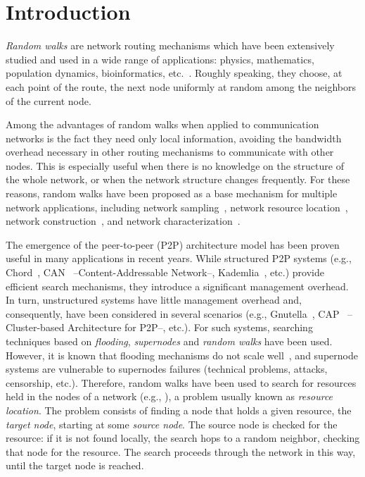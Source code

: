 \documentclass[]{elsarticle}
\begin{document}
\section{Introduction}

\emph{Random walks} are network routing mechanisms which have been extensively studied and used in  a wide range of applications: physics, mathematics,  population dynamics, bioinformatics, etc.~\cite{rw:Hughes95,rw:Lovasz93,rw:Newman06}. Roughly speaking, they choose, at each point of the route, the next node uniformly at random among the neighbors of the current node.

Among the advantages of random walks when applied to communication networks is the fact they need only local information, avoiding the bandwidth overhead necessary in other routing mechanisms to communicate with other nodes. This is especially useful when there is no knowledge on the structure of the whole network, or when the network structure changes frequently. For these reasons, random walks have been proposed as a base mechanism for multiple network applications, including network sampling~\cite{rw:Fortunato06,rw:Lee06}, network resource location~\cite{rw:Adamic01,rw:Gkantsidis06,rw:Rodero10,rw:Yang05}, network construction~\cite{rw:Chawathe03,rw:Law03,rw:Lv02b,rw:Lv02,rw:Mabrouki07}, and network characterization~\cite{rw:Dolev06,rw:Sadagopan05,rw:Tadic01}.

The emergence of the peer-to-peer (P2P) architecture model has been proven useful in many applications in recent years. While structured P2P systems (e.g., Chord~\cite{rod:Stoica01}, CAN~\cite{Ratnasamy:2001:SCN:964723.383072} --Content-Addressable Network--, Kademlia~\cite{Maymounkov:2002:KPI:646334.687801}, etc.) provide efficient search mechanisms, they introduce a significant management overhead. In turn, unstructured systems have little management overhead and, consequently, have been considered in several scenarios (e.g., Gnutella~\cite{rw:Chawathe03,rw:Lv02}, CAP~\cite{Krishnamurthy:2001:EMC:505202.505216} --Cluster-based Architecture for P2P--, etc.). For such systems, searching techniques based on \emph{flooding}, \emph{supernodes} and \emph{random walks} have been used. However, it is known that flooding mechanisms do not scale well~\cite{rod:Jovanovic01}, and supernode systems are vulnerable to supernodes failures (technical problems, attacks, censorship, etc.). Therefore, random walks have been used to search for resources held in the nodes of a network (e.g., \cite{rw:Chawathe03,Manku:2004:KTN:1007352.1007368}), a problem usually known as \emph{resource location}. The problem consists of finding a node that holds a given resource, the \emph{target node}, starting at some \emph{source node}. The source node is checked for the resource: if it is not found locally, the search hops to a random neighbor, checking that node for the resource. The search proceeds through the network in this way, until the target node is reached.
\end{document}
